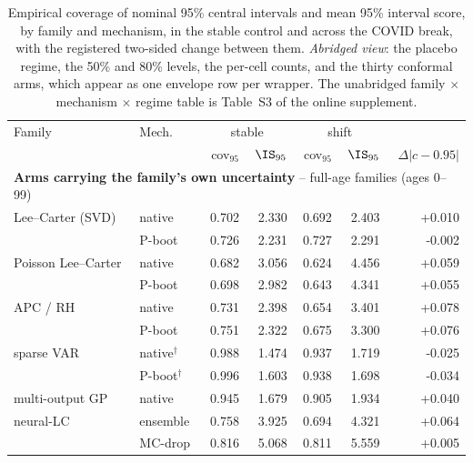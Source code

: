 \begin{table}[tbp]
\centering
\caption{Empirical coverage of nominal 95\% central intervals and mean 95\% interval score, by family and mechanism, in the stable control and across the COVID break, with the registered two-sided change between them. \emph{Abridged view}: the placebo regime, the 50\% and 80\% levels, the per-cell counts, and the thirty conformal arms, which appear as one envelope row per wrapper. The unabridged family $\times$ mechanism $\times$ regime table is Table~S3 of the online supplement.}\label{tab:h2-coverage-main}
\begin{threeparttable}\scriptsize\renewcommand{\arraystretch}{0.90}\setlength{\tabcolsep}{2.5pt}
\begin{tabular}{@{}llrrrrr@{}}
\toprule
Family & Mech. & \multicolumn{2}{c}{stable} & \multicolumn{2}{c}{shift} &  \\
 &  & cov$_{95}$ & $\IS_{95}$ & cov$_{95}$ & $\IS_{95}$ & $\Delta|c-0.95|$ \\
\midrule
\multicolumn{7}{l}{\textbf{Arms carrying the family's own uncertainty} -- full-age families (ages 0--99)} \\
\midrule
Lee--Carter (SVD) & native & 0.702 & 2.330 & 0.692 & 2.403 & +0.010 \\
 & P-boot & 0.726 & 2.231 & 0.727 & 2.291 & -0.002 \\
Poisson Lee--Carter & native & 0.682 & 3.056 & 0.624 & 4.456 & +0.059 \\
 & P-boot & 0.698 & 2.982 & 0.643 & 4.341 & +0.055 \\
APC / RH & native & 0.731 & 2.398 & 0.654 & 3.401 & +0.078 \\
 & P-boot & 0.751 & 2.322 & 0.675 & 3.300 & +0.076 \\
sparse VAR & native$^{\dagger}$ & 0.988 & 1.474 & 0.937 & 1.719 & -0.025 \\
 & P-boot$^{\dagger}$ & 0.996 & 1.603 & 0.938 & 1.698 & -0.034 \\
multi-output GP & native & 0.945 & 1.679 & 0.905 & 1.934 & +0.040 \\
neural-LC & ensemble & 0.758 & 3.925 & 0.694 & 4.321 & +0.064 \\
 & MC-drop & 0.816 & 5.068 & 0.811 & 5.559 & +0.005 \\

\end{tabular}
\end{threeparttable}
\end{table}
